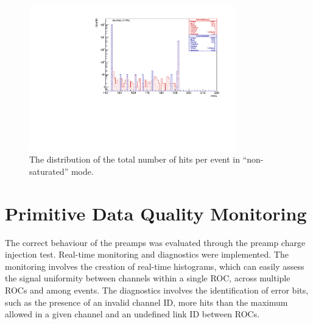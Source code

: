\begin{figure}[!h]
\centering
\includegraphics[width =0.8\textwidth]{figures/pdf/figure_00009_nhits_105038.pdf}
\caption{
  The distribution of the total number of hits per event in ``non-saturated'' mode.
}
\label{fig:6}
\end{figure}
\section{Primitive Data Quality Monitoring}\label{dqm}
The correct behaviour of the preamps was evaluated through the preamp charge injection test. Real-time monitoring and diagnostics were implemented.
The monitoring involves the creation of real-time histograms, which can easily assess 
the signal uniformity between channels within a single ROC, across multiple ROCs and among events.
The diagnostics involves the identification of error bits, such as the presence of an 
invalid channel ID, more hits than the maximum allowed in a given channel and an undefined link ID between ROCs.


